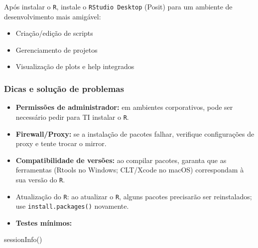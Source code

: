 \documentclass[
  letterpaper,
  DIV=11,
  numbers=noendperiod]{scrreprt}
\newenvironment{Shaded}{\begin{snugshade}}{\end{snugshade}}
\newcommand{\FunctionTok}[1]{\textcolor[rgb]{0.28,0.35,0.67}{#1}}
\newcommand{\NormalTok}[1]{\textcolor[rgb]{0.00,0.23,0.31}{#1}}
\begin{document}
Após instalar o \texttt{R}, instale o \texttt{RStudio\ Desktop} (Posit)
para um ambiente de desenvolvimento mais amigável:

\begin{itemize}
\item
  Criação/edição de scripts
\item
  Gerenciamento de projetos
\item
  Visualização de plots e help integrados
\end{itemize}

\subsubsection*{Dicas e solução de
problemas}\label{dicas-e-soluuxe7uxe3o-de-problemas}

\begin{itemize}
\item
  \textbf{Permissões de administrador:} em ambientes corporativos, pode
  ser necessário pedir para TI instalar o \texttt{R}.
\item
  \textbf{Firewall/Proxy:} se a instalação de pacotes falhar, verifique
  configurações de proxy e tente trocar o mirror.
\item
  \textbf{Compatibilidade de versões:} ao compilar pacotes, garanta que
  as ferramentas (Rtools no Windows; CLT/Xcode no macOS) correspondam à
  sua versão do \texttt{R}.
\item
  Atualização do \texttt{R}: ao atualizar o \texttt{R}, alguns pacotes
  precisarão ser reinstalados; use \texttt{install.packages()}
  novamente.
\item
  \textbf{Testes mínimos:}
\end{itemize}

\begin{Shaded}
\begin{Highlighting}[]
\FunctionTok{sessionInfo}\NormalTok{()}
\end{Highlighting}
\end{Shaded}
\end{document}
